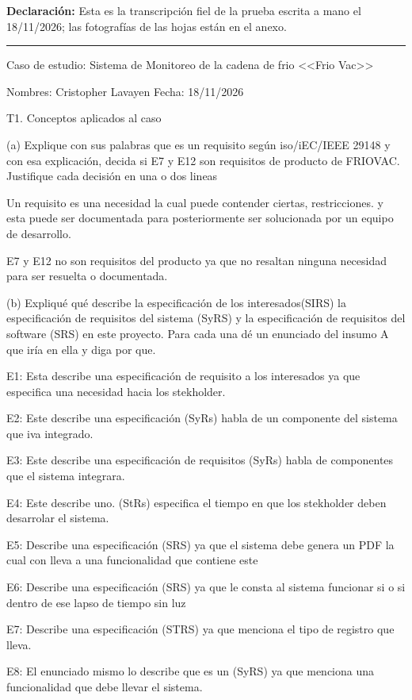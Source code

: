 \documentclass[11pt,a4paper]{article}
\begin{document}
\textbf{Declaración:} Esta es la transcripción fiel de la prueba escrita a mano el 18/11/2026; las fotografías de las hojas están en el anexo.

\bigskip
\hrule
\bigskip

Caso de estudio: Sistema de Monitoreo de la cadena de frio <<Frio Vac>>

Nombres: Cristopher Lavayen \hfill Fecha: 18/11/2026

T1. Conceptos aplicados al caso

(a) Explique con sus palabras que es un requisito según iso/iEC/IEEE 29148 y con esa explicación, decida si E7 y E12 son requisitos de producto de FRIOVAC. Justifique cada decisión en una o dos lineas

Un requisito es una necesidad la cual puede contender ciertas, restricciones. y esta puede ser documentada para posteriormente ser solucionada por un equipo de desarrollo.

E7 y E12 no son requisitos del producto ya que no resaltan ninguna necesidad para ser resuelta o documentada.

(b) Expliqué qué describe la especificación de los interesados(SIRS) la especificación de requisitos del sistema (SyRS) y la especificación de requisitos del software (SRS) en este proyecto. Para cada una dé un enunciado del insumo A que iría en ella y diga por que.

E1: Esta describe una especificación de requisito a los interesados ya que especifica una necesidad hacia los stekholder.

E2: Este describe una especificación (SyRs) habla de un componente del sistema que iva integrado.

E3: Este describe una especificación de requisitos (SyRs) habla de componentes que el sistema integrara.

E4: Este describe uno. (StRs) especifica el tiempo en que los stekholder deben desarrolar el sistema.

\clearpage

E5: Describe una especificación (SRS) ya que el sistema debe genera un PDF la cual con lleva a una funcionalidad que contiene este

E6: Describe una especificación (SRS) ya que le consta al sistema funcionar si o si dentro de ese lapso de tiempo sin luz

E7: Describe una especificación (STRS) ya que menciona el tipo de registro que lleva.

E8: El enunciado mismo lo describe que es un (SyRS) ya que menciona una funcionalidad que debe llevar el sistema.
\end{document}
